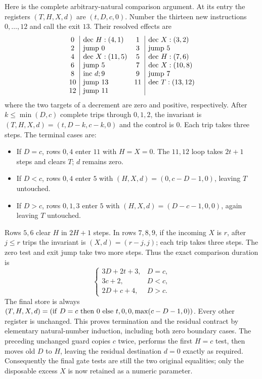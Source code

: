 Here is the complete arbitrary-natural comparison argument. At its entry
the registers $(T,H,X,d)$ are $(t,D,c,0)$. Number the thirteen new
instructions $0,\ldots,12$ and call the exit $13$. Their resolved effects
are
\[
\begin{array}{c|l@{\quad}c|l}
0&{\rm dec}\ H:(4,1)&1&{\rm dec}\ X:(3,2)\\
2&{\rm jump}\ 0&3&{\rm jump}\ 5\\
4&{\rm dec}\ X:(11,5)&5&{\rm dec}\ H:(7,6)\\
6&{\rm jump}\ 5&7&{\rm dec}\ X:(10,8)\\
8&{\rm inc}\ d;9&9&{\rm jump}\ 7\\
10&{\rm jump}\ 13&11&{\rm dec}\ T:(13,12)\\
12&{\rm jump}\ 11&&
\end{array}
\]
where the two targets of a decrement are zero and positive, respectively.
After $k\le\min(D,c)$ complete trips through $0,1,2$, the invariant is
$(T,H,X,d)=(t,D-k,c-k,0)$ and the control is $0$. Each trip takes three
steps. The terminal cases are:
\begin{itemize}
\item If $D=c$, rows $0,4$ enter $11$ with $H=X=0$.
The $11,12$ loop takes $2t+1$ steps and clears $T$; $d$ remains zero.
\item If $D<c$, rows $0,4$ enter $5$ with
$(H,X,d)=(0,c-D-1,0)$, leaving $T$ untouched.
\item If $D>c$, rows $0,1,3$ enter $5$ with
$(H,X,d)=(D-c-1,0,0)$, again leaving $T$ untouched.
\end{itemize}
Rows $5,6$ clear $H$ in $2H+1$ steps. In rows $7,8,9$, if the incoming
$X$ is $r$, after $j\le r$ trips the invariant is
$(X,d)=(r-j,j)$; each trip takes three steps. The zero test and exit
jump take two more steps. Thus the exact comparison duration is
\[
 \begin{cases}
 3D+2t+3,&D=c,\\
 3c+2,&D<c,\\
 2D+c+4,&D>c.
 \end{cases}
\]
The final store is always
$(T,H,X,d)=({\rm if}\ D=c\ {\rm then}\ 0\ {\rm else}\ t,0,0,
\max(c-D-1,0))$. Every other register is unchanged. This proves
termination and the residual contract by elementary natural-number
induction, including both zero boundary cases. The preceding unchanged
guard copies $c$ twice, performs the first $H=c$ test, then moves old
$D$ to $H$, leaving the residual destination $d=0$ exactly as required.
Consequently the final gate tests are still the two original equalities;
only the disposable excess $X$ is now retained as a numeric parameter.

